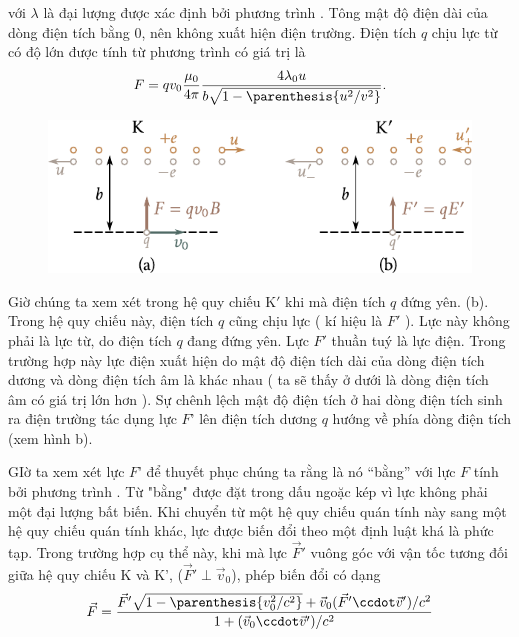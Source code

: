 \noindent
 với  $\lambda$ là đại lượng được xác định bởi phương trình . Tông mật độ điện  dài của dòng điện tích bằng 0, nên không xuất hiện điện trường. Điện tích $q$ chịu lực từ có độ lớn được tính từ phương trình  có giá trị là
\begin{equation}\label{eq:6_51}
    F = q v_0 \frac{\mu_0}{4\pi} \frac{4 \lambda_0 u}{b \sqrt{1 - \parenthesis{u^2/v^2}}}.
\end{equation}

\begin{figure}[t]
	\begin{center}
		\includegraphics[scale=1]{figures/ch_06/fig_6_13.pdf}
		\caption[]{}
		\label{fig:6_13}
	\end{center}
	\vspace{-0.8cm}
\end{figure}

Giờ chúng ta xem xét trong hệ quy chiếu K$'$ khi mà điện tích $q$ đứng yên. (b). Trong hệ quy chiếu này, điện tích $q$ cũng chịu lực ( kí hiệu là $F'$ ). Lực này không phải là lực từ, do điện tích $q$ đang đứng yên. Lực $F'$ thuần tuý là lực điện. Trong trường hợp này lực điện xuất hiện do mật độ điện tích dài của dòng điện tích dương và dòng điện tích âm là khác nhau ( ta sẽ thấy ở dưới là dòng điện tích âm có giá trị lớn hơn ). Sự chênh lệch mật độ điện tích ở hai dòng điện tích sinh ra điện trường tác dụng lực $F’$ lên điện tích dương $q$ hướng về phía dòng điện tích (xem hình  b).

GIờ ta xem xét lực $F’$ để thuyết phục chúng ta rằng là nó “bằng” với lực $F$ tính bởi phương trình . Từ "bằng" được đặt trong dấu ngoặc kép vì lực không phải một đại lượng bất biến. Khi chuyển từ một hệ quy chiếu quán tính này sang một hệ quy chiếu quán tính khác, lực được biến đổi theo một định luật khá là phức tạp. Trong trường hợp cụ thể này, khi mà lực $\vec{F}'$ vuông góc với vận tốc tương đối giữa hệ quy chiếu K và K’, ($\vec{F}' \perp \vec{v}_0$), phép biến đổi có dạng
\begin{equation*}
    \vec{F} = \frac{\vec{F}' \sqrt{1 - \parenthesis{v_0^2/c^2}} + \vec{v}_0 (\vec{F}'\ccdot\vec{v}')/c^2}{1 + (\vec{v}_0\ccdot\vec{v}')/c^2}
\end{equation*}

